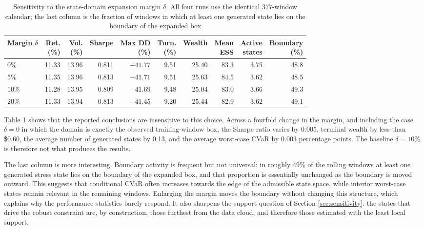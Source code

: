 \documentclass[smallcondensed]{svjour3}
\begin{document}
\begin{table}[!htbp]
\centering
\caption{Sensitivity to the state-domain expansion margin $\delta$. All four runs
use the identical 377-window calendar; the last column is the fraction of windows
in which at least one generated state lies on the boundary of the expanded box}
\label{tab:margin}
\footnotesize
\begin{adjustbox}{max width=\textwidth}
\begin{tabular}{lrrrrrrrrr}
\toprule
\makecell[l]{\textbf{Margin}\\\textbf{$\delta$}} & \makecell[r]{\textbf{Ret.}\\\textbf{(\%)}} & \makecell[r]{\textbf{Vol.}\\\textbf{(\%)}} & \textbf{Sharpe} & \makecell[r]{\textbf{Max DD}\\\textbf{(\%)}} & \makecell[r]{\textbf{Turn.}\\\textbf{(\%)}} & \textbf{Wealth} & \makecell[r]{\textbf{Mean}\\\textbf{ESS}} & \makecell[r]{\textbf{Active}\\\textbf{states}} & \makecell[r]{\textbf{Boundary}\\\textbf{(\%)}} \\
\midrule
$0\%$  & 11.33 & 13.96 & 0.811 & $-41.77$ & 9.51 & 25.40 & 83.3 & 3.75 & 48.8 \\
$5\%$  & 11.35 & 13.96 & 0.813 & $-41.71$ & 9.51 & 25.63 & 84.5 & 3.62 & 48.5 \\
$10\%$ & 11.28 & 13.95 & 0.809 & $-41.69$ & 9.48 & 25.04 & 83.0 & 3.66 & 49.3 \\
$20\%$ & 11.33 & 13.94 & 0.813 & $-41.45$ & 9.20 & 25.44 & 82.9 & 3.62 & 49.1 \\
\bottomrule
\end{tabular}
\end{adjustbox}
\end{table}

Table \ref{tab:margin} shows that the reported conclusions are insensitive to
this choice. Across a fourfold change in the margin, and including the case
$\delta = 0$ in which the domain is exactly the observed training-window box, the
Sharpe ratio varies by 0.005, terminal wealth by less than \$0.60, the average
number of generated states by 0.13, and the average worst-case CVaR by 0.003
percentage points. The baseline $\delta = 10\%$ is therefore not what produces
the results.

The last column is more interesting. Boundary activity is frequent but not
universal: in roughly 49\% of the rolling windows at least one generated stress
state lies on the boundary of the expanded box, and that proportion is
essentially unchanged as the boundary is moved outward. This suggests that
conditional CVaR often increases towards the edge of the admissible state space,
while interior worst-case states remain relevant in the remaining windows.
Enlarging the margin moves the boundary without changing this structure, which
explains why the performance statistics barely respond. It also
sharpens the support question of Section \ref{sec:sensitivity}: the states that
drive the robust constraint are, by construction, those furthest from the data
cloud, and therefore those estimated with the least local support.
\end{document}
